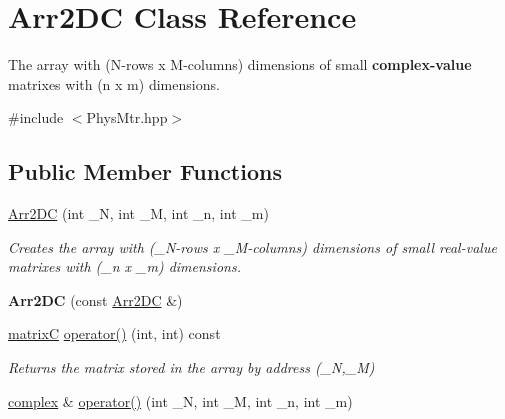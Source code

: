 \hypertarget{class_arr2_d_c}{}\section{Arr2\+DC Class Reference}
\label{class_arr2_d_c}


The array with (N-\/rows x M-\/columns) dimensions of small {\bfseries complex-\/value} matrixes with (n x m) dimensions.  




{\ttfamily \#include $<$Phys\+Mtr.\+hpp$>$}

\subsection*{Public Member Functions}
\begin{DoxyCompactItemize}
\item 
\mbox{\label{class_arr2_d_c_a87e18ab9a56555389e6775a7ee056a17}} 
\mbox{\hyperlink{class_arr2_d_c_a87e18ab9a56555389e6775a7ee056a17}{Arr2\+DC}} (int \+\_\+N, int \+\_\+M, int \+\_\+n, int \+\_\+m)
\begin{DoxyCompactList}\small\item\em Creates the array with (\+\_\+\+N-\/rows x \+\_\+\+M-\/columns) dimensions of small real-\/value matrixes with (\+\_\+n x \+\_\+m) dimensions. \end{DoxyCompactList}\item 
\mbox{\label{class_arr2_d_c_a2773832eea01bc15f0cf822b937613a9}} 
{\bfseries Arr2\+DC} (const \mbox{\hyperlink{class_arr2_d_c}{Arr2\+DC}} \&)
\item 
\mbox{\label{class_arr2_d_c_ae24f9385bdef3130edc482b13f3b9ac1}} 
\mbox{\hyperlink{classmatrix_c}{matrixC}} \mbox{\hyperlink{class_arr2_d_c_ae24f9385bdef3130edc482b13f3b9ac1}{operator()}} (int, int) const
\begin{DoxyCompactList}\small\item\em Returns the matrix stored in the array by address (\+\_\+N,\+\_\+M) \end{DoxyCompactList}\item 
\mbox{\label{class_arr2_d_c_adb7d2241c6352c2045ae8dba2e797946}} 
\mbox{\hyperlink{classcomplex}{complex}} \& \mbox{\hyperlink{class_arr2_d_c_adb7d2241c6352c2045ae8dba2e797946}{operator()}} (int \+\_\+N, int \+\_\+M, int \+\_\+n, int \+\_\+m)

\end{DoxyCompactItemize}

